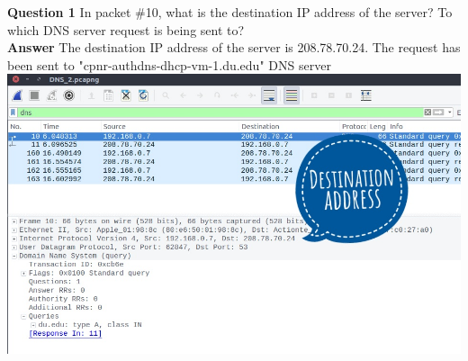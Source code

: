 \documentclass[14pt]{extarticle}
\begin{document}
    \noindent
    \textbf{\large Question 1}
    In packet \#10, what is the destination IP address of the server? 
    To which DNS server request is being sent to?\\[10pt]
    \textbf{\large Answer}
    The destination IP address of the server is 208.78.70.24. The request has been sent to "cpnr-authdns-dhcp-vm-1.du.edu" DNS server\\[10pt]
    \includegraphics[scale=0.45]{2_1}\\[10pt]
    \vspace{1cm}
\end{document}
